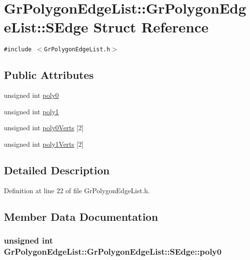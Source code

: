 \hypertarget{struct_gr_polygon_edge_list_1_1_s_edge}{
\section{GrPolygonEdgeList::GrPolygonEdgeList::SEdge Struct Reference}
\label{struct_gr_polygon_edge_list_1_1_s_edge}
}
{\tt \#include $<$GrPolygonEdgeList.h$>$}

\subsection*{Public Attributes}
\begin{CompactItemize}
\item 
unsigned int \hyperlink{struct_gr_polygon_edge_list_1_1_s_edge_92b3595c8b177dd890ead716041d7c7c}{poly0}
\item 
unsigned int \hyperlink{struct_gr_polygon_edge_list_1_1_s_edge_fe945b7808586a1f3eab3fd0cd6b4ffd}{poly1}
\item 
unsigned int \hyperlink{struct_gr_polygon_edge_list_1_1_s_edge_db1ce702fd6d6c66282043d7003a49f6}{poly0Verts} \mbox{[}2\mbox{]}
\item 
unsigned int \hyperlink{struct_gr_polygon_edge_list_1_1_s_edge_11cd6790cd93d269c06243ff5e40bf86}{poly1Verts} \mbox{[}2\mbox{]}
\end{CompactItemize}


\subsection{Detailed Description}


Definition at line 22 of file GrPolygonEdgeList.h.

\subsection{Member Data Documentation}
\hypertarget{struct_gr_polygon_edge_list_1_1_s_edge_92b3595c8b177dd890ead716041d7c7c}{
\subsubsection[{poly0}]{\setlength{\rightskip}{0pt plus 5cm}unsigned int GrPolygonEdgeList::GrPolygonEdgeList::SEdge::poly0}}
\label{struct_gr_polygon_edge_list_1_1_s_edge_92b3595c8b177dd890ead716041d7c7c}




